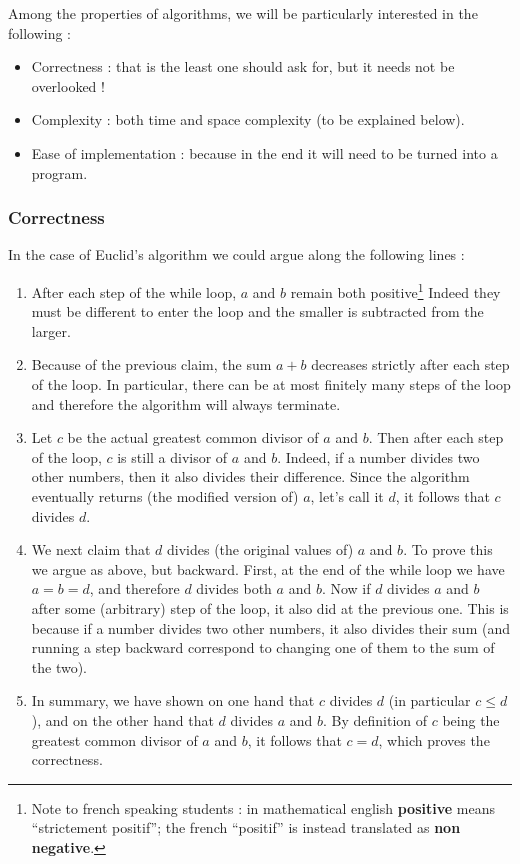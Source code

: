 \documentclass[12pt]{article}
\theoremstyle{plain}
\theoremstyle{remark}
\begin{document}
Among the properties of algorithms, we will be particularly interested in the
following :
\begin{itemize}
\item Correctness : that is the least one should ask for, but it needs not be overlooked !
\item Complexity : both time and space complexity (to be explained below).
\item Ease of implementation : because in the end it will need to be turned
into a program.
\end{itemize}

\subsubsection*{Correctness}
In the case of Euclid's algorithm we could argue along
the following lines :
\begin{enumerate}
\item After each step of the while loop, $a$ and $b$ remain both
	positive\footnote{Note to french speaking students : in mathematical english
		{\bf positive} means ``strictement positif''; the french ``positif''
		is instead translated as {\bf non negative}.}
Indeed they must be different to enter the loop and the smaller is subtracted
from the larger. 
\item Because of the previous claim, the sum $a + b$ decreases strictly after
each step of the loop. In particular, there can be at most finitely many steps
of the loop and therefore the algorithm will always terminate.
\item Let $c$ be the actual greatest common divisor of $a$ and $b$. Then after
each step of the loop, $c$ is still a divisor of $a$ and $b$. Indeed, if a
number divides two other numbers, then it also divides their difference. Since
the algorithm eventually returns (the modified version of) $a$, let's call it
$d$, it follows that $c$ divides $d$.
\item We next claim that $d$ divides (the original values of) $a$ and $b$. To
prove this we argue as above, but backward. First, at the end of the while loop
we have $a = b = d$, and therefore $d$ divides both $a$ and $b$. Now if $d$
divides $a$ and $b$ after some (arbitrary) step of the loop, it also did at the
previous one. This is because if a number divides two other numbers, it also
divides their sum (and running a step backward correspond to changing one of
them to the sum of the two). 
\item In summary, we have shown on one hand that $c$ divides $d$ (in particular
$c \leq d$), and on the other hand that $d$ divides $a$
and $b$. By definition of $c$ being the greatest common divisor of $a$ and $b$,
it follows that $c = d$, which proves the correctness.
\end{enumerate} 
\end{document}
